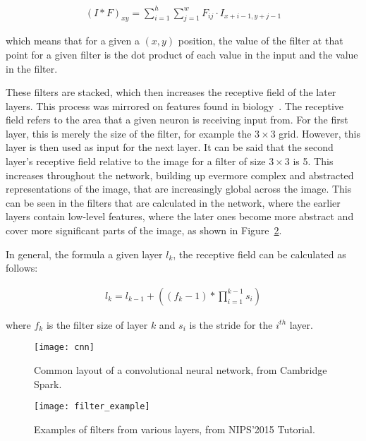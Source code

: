 \begin{align}
    {(I*F)}_{xy} = \sum^{h}_{i=1} \sum^{w}_{j=1} F_{ij} \cdot I_{x+i-1, y+j-1}
\end{align}

which means that for a given a $(x,y)$ position, the value of the filter at that
point for a given filter is the dot product of each value in the input and the
value in the filter.

These filters are stacked, which then increases the receptive field of the later
layers. This process was mirrored on features found in
biology~\cite{hubel1968receptive}. The receptive field refers to the area that a
given neuron is receiving input from. For the first layer, this is merely the
size of the filter, for example the $3 \times 3$ grid. However, this layer is
then used as input for the next layer. It can be said that the second layer's
receptive field relative to the image for a filter of size $3 \times 3$ is
5. This increases throughout the network, building up evermore complex and
abstracted representations of the image, that are increasingly global across the
image. This can be seen in the filters that are calculated in the network,
where the earlier layers contain low-level features, where the later
ones become more abstract and cover more significant parts of the image,
as shown in Figure~\ref{fig:filter_example}.

In general, the formula a given layer $l_k$, the receptive field can be
calculated as follows:

\begin{align}
    l_k = l_{k-1} + ((f_k - 1) * \prod_{i=1}^{k-1}s_i)
\end{align}

where $f_k$ is the filter size of layer $k$ and $s_i$ is the stride for the
$i^{th}$ layer.


\begin{figure}
    \centering
    \texttt{[image: cnn]}
    \caption{Common layout of a convolutional neural network, from
    Cambridge Spark\cite{cnn-layout}.}%
    \label{fig:cnn}
\end{figure}

\begin{figure}
    \centering
    \texttt{[image: filter\_example]}
    \caption{Examples of filters from various layers, from
    NIPS'2015 Tutorial\cite{filterexample}.}%
    \label{fig:filter_example}
\end{figure}

